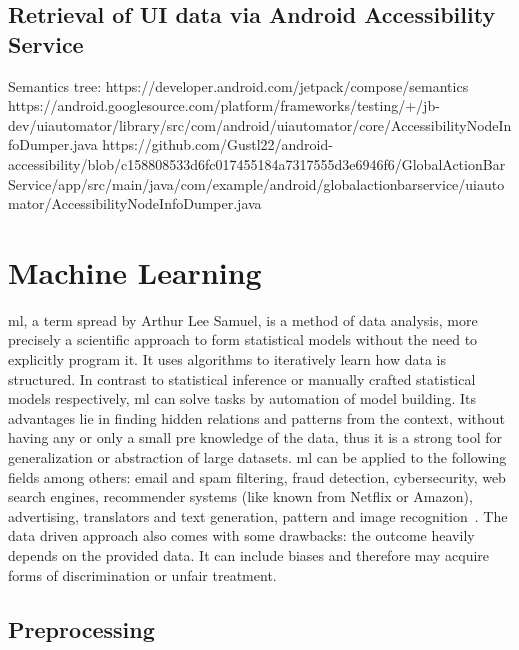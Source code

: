 \subsection{Retrieval of UI data via Android Accessibility Service}

Semantics tree:
https://developer.android.com/jetpack/compose/semantics
https://android.googlesource.com/platform/frameworks/testing/+/jb-dev/uiautomator/library/src/com/android/uiautomator/core/AccessibilityNodeInfoDumper.java
https://github.com/Gustl22/android-accessibility/blob/c158808533d6fc017455184a7317555d3e6946f6/GlobalActionBarService/app/src/main/java/com/example/android/globalactionbarservice/uiautomator/AccessibilityNodeInfoDumper.java



\section{Machine Learning}
\label{sec:machine-learning}

\acrfull{ml}, a term spread by Arthur Lee Samuel, is a method of data analysis, more precisely a scientific approach to form statistical models without the need to explicitly program it.
It uses algorithms to iteratively learn how data is structured.
In contrast to statistical inference or manually crafted statistical models respectively, \acrshort{ml} can solve tasks by automation of model building.
Its advantages lie in finding hidden relations and patterns from the context, without having any or only a small pre knowledge of the data, thus it is a strong tool for generalization or abstraction of large datasets.
\acrshort{ml} can be applied to the following fields among others: email and spam filtering, fraud detection, cybersecurity, web search engines, recommender systems (like known from Netflix or Amazon), advertising, translators and text generation, pattern and image recognition~\cite{mahesh2020machine}.
The data driven approach also comes with some drawbacks: the outcome heavily depends on the provided data.
It can include biases and therefore may acquire forms of discrimination or unfair treatment.


\subsection{Preprocessing}


